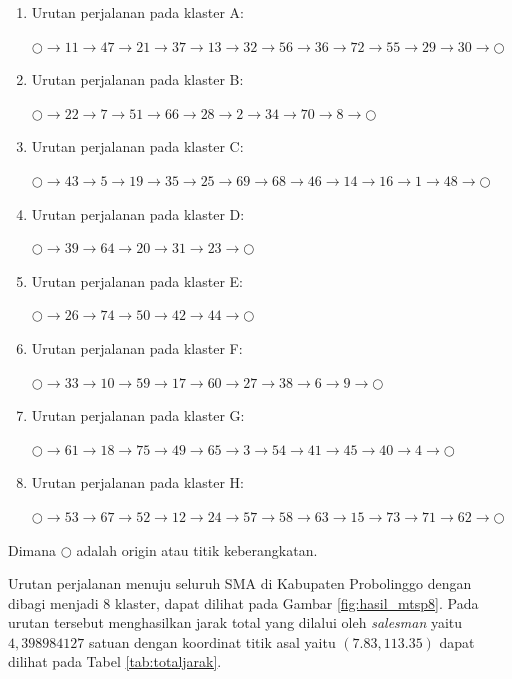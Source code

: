 \begin{enumerate}
\item Urutan perjalanan pada klaster A:

$\bigcirc \to 11 \to 47 \to 21 \to 37 \to 13 \to 32 \to 56 \to 36 \to 72 \to 55 \to 29 \to 30 \to \bigcirc$

\item Urutan perjalanan pada klaster B:

$\bigcirc \to 22 \to 7 \to 51 \to 66 \to 28 \to 2 \to 34 \to 70 \to 8 \to \bigcirc$

\item Urutan perjalanan pada klaster C:

$\bigcirc \to 43 \to 5 \to 19 \to 35 \to 25 \to 69 \to 68 \to 46 \to 14 \to 16 \to 1 \to 48 \to \bigcirc$

\item Urutan perjalanan pada klaster D:

$\bigcirc \to 39 \to 64 \to 20 \to 31 \to 23 \to \bigcirc$

\item Urutan perjalanan pada klaster E:

$\bigcirc \to 26 \to 74 \to 50 \to 42 \to 44 \to \bigcirc$

\item Urutan perjalanan pada klaster F:

$\bigcirc \to 33 \to 10 \to 59 \to 17 \to 60 \to 27 \to 38 \to 6 \to 9 \to \bigcirc$

\item Urutan perjalanan pada klaster G:

$\bigcirc \to 61 \to 18 \to 75 \to 49 \to 65 \to 3 \to 54 \to 41 \to 45 \to 40 \to 4 \to \bigcirc$

\item Urutan perjalanan pada klaster H:

$\bigcirc \to 53 \to 67 \to 52 \to 12 \to 24 \to 57 \to 58 \to 63 \to 15 \to 73 \to 71 \to 62 \to \bigcirc$
\end{enumerate}

\noindent Dimana $\bigcirc$ adalah origin atau titik keberangkatan.

Urutan perjalanan menuju seluruh SMA di Kabupaten Probolinggo dengan dibagi menjadi 8 klaster, dapat dilihat pada Gambar \ref{fig:hasil_mtsp8}. Pada urutan tersebut menghasilkan jarak total yang dilalui oleh \textit{salesman} yaitu $4,398984127$ satuan dengan koordinat titik asal yaitu $(7.83, 113.35)$ dapat dilihat pada Tabel \ref{tab:totaljarak}.


